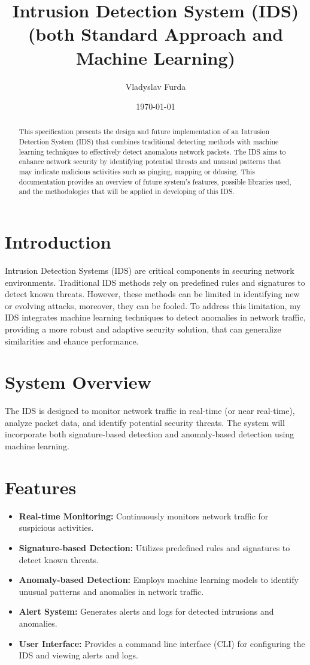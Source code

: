 \documentclass{article}
\title{Intrusion Detection System (IDS) (both Standard Approach and Machine Learning)}
\author{Vladyslav Furda}
\date{\today}
\begin{document}
\maketitle

\begin{abstract}
    This specification presents the design and future implementation of an Intrusion Detection System (IDS) that combines traditional detecting methods with machine learning techniques to effectively detect anomalous network packets. The IDS aims to enhance network security by identifying potential threats and unusual patterns that may indicate malicious activities such as pinging, mapping or ddosing. This documentation provides an overview of future system's features, possible libraries used, and the methodologies that will be applied in developing of this IDS.
\end{abstract}

\section{Introduction}
    Intrusion Detection Systems (IDS) are critical components in securing network environments. Traditional IDS methods rely on predefined rules and signatures to detect known threats. However, these methods can be limited in identifying new or evolving attacks, moreover, they can be fooled. To address this limitation, my IDS integrates machine learning techniques to detect anomalies in network traffic, providing a more robust and adaptive security solution, that can generalize similarities and ehance performance.

\section{System Overview}
    The IDS is designed to monitor network traffic in real-time (or near real-time), analyze packet data, and identify potential security threats. The system will incorporate both signature-based detection and anomaly-based detection using machine learning.

\section{Features}
    \begin{itemize}
        \item \textbf{Real-time Monitoring:} Continuously monitors network traffic for suspicious activities.
        \item \textbf{Signature-based Detection:} Utilizes predefined rules and signatures to detect known threats.
        \item \textbf{Anomaly-based Detection:} Employs machine learning models to identify unusual patterns and anomalies in network traffic.
        \item \textbf{Alert System:} Generates alerts and logs for detected intrusions and anomalies.
        \item \textbf{User Interface:} Provides a command line interface (CLI) for configuring the IDS and viewing alerts and logs.
    \end{itemize}
\end{document}
